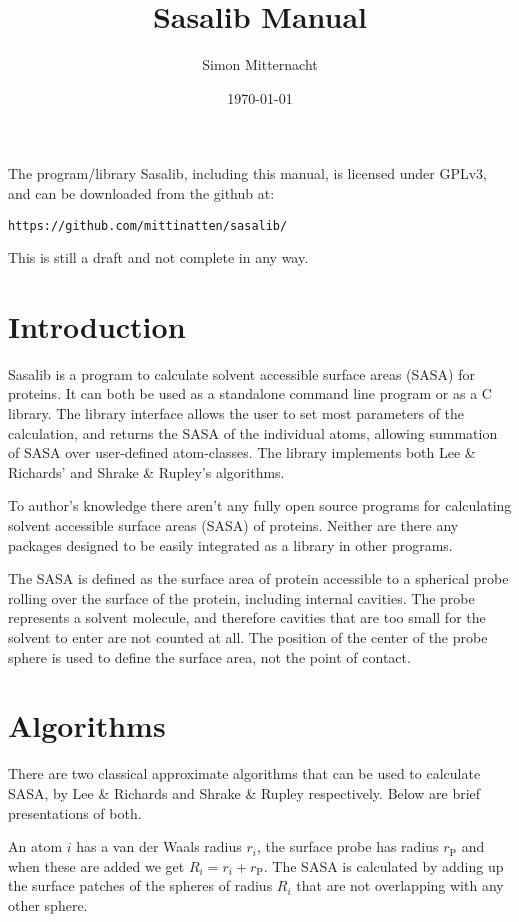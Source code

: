 \documentclass[a4paper,11pt]{article}
\author{Simon Mitternacht}
\date{\today}
\title{Sasalib Manual}
\begin{document}
\maketitle

The program/library Sasalib, including this manual, is licensed under
GPLv3, and can be downloaded from the github at: 
\begin{center}
\texttt{https://github.com/mittinatten/sasalib/}
\end{center}

This is still a draft and not complete in any way.

\newpage
\section{Introduction}

Sasalib is a program to calculate solvent accessible surface areas
(SASA) for proteins. It can both be used as a standalone command line
program or as a C library. The library interface allows the user to
set most parameters of the calculation, and returns the SASA of the
individual atoms, allowing summation of SASA over user-defined
atom-classes. The library implements both Lee \& Richards' and Shrake
\& Rupley's algorithms.

To author's knowledge there aren't any fully open source programs for
calculating solvent accessible surface areas (SASA) of
proteins. Neither are there any packages designed to be easily
integrated as a library in other programs. 

The SASA is defined as the surface area of protein accessible to a
spherical probe rolling over the surface of the protein, including
internal cavities. The probe represents a solvent molecule, and
therefore cavities that are too small for the solvent to enter are not
counted at all. The position of the center of the probe sphere is used
to define the surface area, not the point of contact.

\section{Algorithms}

There are two classical approximate algorithms that can be used to
calculate SASA, by Lee \& Richards and Shrake \& Rupley
respectively. Below are brief presentations of both. 

An atom $i$ has a van der Waals radius $r_i$, the surface probe has
radius $r_\text{P}$ and when these are added we get $R_i = r_i +
r_\text{P}$. The SASA is calculated by adding up the surface patches
of the spheres of radius $R_i$ that are not overlapping with any other
sphere.
\end{document}
